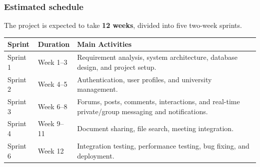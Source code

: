 \documentclass[12pt]{article}
\renewcommand{\baselinestretch}{1.5}
\begin{document}
\subsubsection*{Estimated schedule}
\par\medskip
The project is expected to take \textbf{12 weeks}, divided into five two-week sprints.
\par\medskip
\begingroup
\scriptsize
\renewcommand{\baselinestretch}{1.0}\selectfont
\renewcommand{\arraystretch}{1.15}
\setlength{\tabcolsep}{4pt}
\begin{longtable}{|>{\raggedright\arraybackslash}p{}|>{\raggedright\arraybackslash}p{}|>{\raggedright\arraybackslash}p{}|}
\hline
Sprint & Duration & Main Activities \\ \hline
\endhead
Sprint 1 & Week 1–3 & Requirement analysis, system architecture, database design, and project setup. \\ \hline
Sprint 2 & Week 4–5 & Authentication, user profiles, and university management. \\ \hline
Sprint 3 & Week 6–8 & Forums, posts, comments, interactions, and real-time private/\allowbreak{}group messaging and notifications. \\ \hline
Sprint 4 & Week 9–11 & Document sharing, file search, meeting integration. \\ \hline
Sprint 6 & Week 12 & Integration testing, performance testing, bug fixing, and deployment. \\ \hline
\end{longtable}
\endgroup
\par\medskip
\hypertarget{sec:re-estimation-situation}{}
\end{document}

